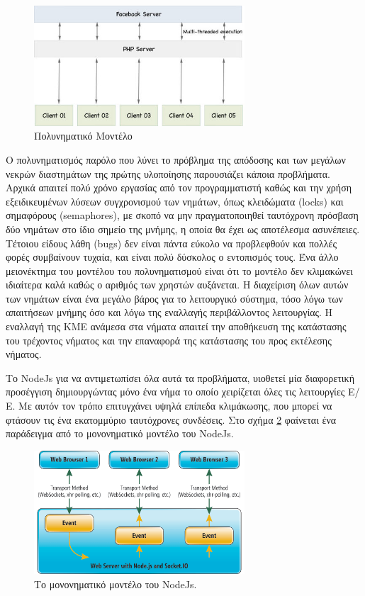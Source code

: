 		
				 \begin{figure}[h]
	    \centering
	    \includegraphics[width=0.7\textwidth]{multi-threaded.jpg}
	    \caption{Πολυνηματικό Μοντέλο}
	    \label{fig:multi}
	\end{figure}
	
	
	
		 Ο πολυνηματισμός παρόλο που λύνει το πρόβλημα της απόδοσης και των μεγάλων νεκρών διαστημάτων της πρώτης υλοποίησης παρουσιάζει κάποια προβλήματα. Αρχικά απαιτεί πολύ χρόνο εργασίας από τον προγραμματιστή καθώς και την χρήση εξειδικευμένων λύσεων συγχρονισμού των νημάτων, όπως κλειδώματα (locks) και σημαφόρους (semaphores), με σκοπό να μην πραγματοποιηθεί ταυτόχρονη πρόσβαση δύο νημάτων στο ίδιο σημείο της μνήμης, η οποία θα έχει ως αποτέλεσμα ασυνέπειες.  \cite{silberschatz} Τέτοιου είδους λάθη (bugs) δεν είναι πάντα εύκολο να προβλεφθούν και πολλές φορές συμβαίνουν τυχαία, και είναι πολύ δύσκολος ο εντοπισμός τους. Ένα άλλο μειονέκτημα του μοντέλου του πολυνηματισμού είναι ότι το μοντέλο  δεν κλιμακώνει ιδιαίτερα καλά καθώς ο αριθμός των χρηστών αυξάνεται. Η διαχείριση όλων αυτών των νημάτων είναι ένα μεγάλο βάρος για το λειτουργικό σύστημα, τόσο λόγω των απαιτήσεων μνήμης όσο και λόγω της εναλλαγής περιβάλλοντος λειτουργίας. Η εναλλαγή της ΚΜΕ ανάμεσα στα νήματα απαιτεί την αποθήκευση της κατάστασης του τρέχοντος νήματος και την επαναφορά της κατάστασης του προς εκτέλεσης νήματος. 
		
		 
		 Το NodeJs για να αντιμετωπίσει όλα αυτά τα προβλήματα, υιοθετεί μία διαφορετική προσέγγιση δημιουργώντας μόνο ένα νήμα το οποίο χειρίζεται όλες τις λειτουργίες Ε/Ε. Με αυτόν τον τρόπο επιτυγχάνει υψηλά επίπεδα κλιμάκωσης, που μπορεί να φτάσουν τις ένα εκατομμύριο ταυτόχρονες συνδέσεις. Στο σχήμα \ref{fig:single} φαίνεται ένα παράδειγμα από το μονονηματικό μοντέλο του NodeJs.
		 
			 \begin{figure}[h]
	    \centering
	    \includegraphics[width=0.7\textwidth]{single.png}
	    \caption{ Το μονονηματικό μοντέλο του NodeJs.}
	    \label{fig:single}
	\end{figure} 

